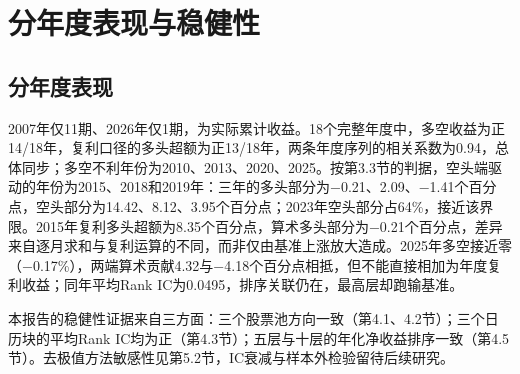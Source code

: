 \Needspace{60mm}
\section{分年度表现与稳健性}
\subsection{分年度表现}

2007年仅11期、2026年仅1期，为实际累计收益。18个完整年度中，多空收益为正14/18年，复利口径的多头超额为正13/18年，两条年度序列的相关系数为0.94，总体同步；多空不利年份为2010、2013、2020、2025。按第3.3节的判据，空头端驱动的年份为2015、2018和2019年：三年的多头部分为$-$0.21、2.09、$-$1.41个百分点，空头部分为14.42、8.12、3.95个百分点；2023年空头部分占64\%，接近该界限。2015年复利多头超额为8.35个百分点，算术多头部分为$-$0.21个百分点，差异来自逐月求和与复利运算的不同，而非仅由基准上涨放大造成。2025年多空接近零（$-$0.17\%），两端算术贡献4.32与$-$4.18个百分点相抵，但不能直接相加为年度复利收益；同年平均Rank IC为0.0495，排序关联仍在，最高层却跑输基准。

本报告的稳健性证据来自三方面：三个股票池方向一致（第4.1、4.2节）；三个日历块的平均Rank IC均为正（第4.3节）；五层与十层的年化净收益排序一致（第4.5节）。去极值方法敏感性见第5.2节，IC衰减与样本外检验留待后续研究。



